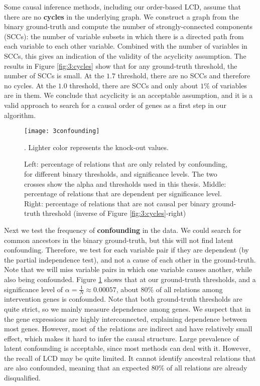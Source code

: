 Some causal inference methods, including our order-based LCD, assume that there are no \textbf{cycles} in the underlying graph. We construct a graph from the binary ground-truth and compute the number of strongly-connected components (SCCs): the number of variable subsets in which there is a directed path from each variable to each other variable. Combined with the number of variables in SCCs, this gives an indication of the validity of the acyclicity assumption. The results in Figure \ref{fig:3:cycles} show that for any ground-truth threshold, the number of SCCs is small. At the $1.7$ threshold, there are no SCCs and therefore no cycles. At the $1.0$ threshold, there are SCCs and only about $1\%$ of variables are in them. We conclude that acyclicity is an acceptable assumption, and it is a valid approach to search for a causal order of genes as a first step in our algorithm.

\begin{figure}[h]
    \centering
    \texttt{[image: 3confounding]}
    \caption{Left: percentage of relations that are only related by confounding, for different binary thresholds, and significance levels. The two crosses show the alpha and thresholds used in this thesis. Middle: percentage of relations that are dependent per significance level. Right: percentage of relations that are not causal per binary ground-truth threshold (inverse of Figure \ref{fig:3:cycles}-right)}. Lighter color represents the knock-out values.
    \label{fig:3:confounding}
\end{figure}    

Next we test the frequency of \textbf{confounding} in the data. We could search for common ancestors in the binary ground-truth, but this will not find latent confounding. Therefore, we test for each variable pair if they are dependent (by the partial independence test), and not a cause of each other in the ground-truth. Note that we will miss variable pairs in which one variable causes another, while also being confounded. Figure \ref{fig:3:confounding} shows that at our ground-truth thresholds, and a significance level of $\alpha = \frac{1}{N} \approx 0.00057$, about $80\%$ of all relations among intervention genes is confounded. Note that both ground-truth thresholds are quite strict, so we mainly measure dependence among genes. We suspect that in the gene expressions are highly interconnected, explaining dependence between most genes. However, most of the relations are indirect and have relatively small effect, which makes it hard to infer the causal structure. Large prevalence of latent confounding is acceptable, since most methods can deal with it. However, the recall of LCD may be quite limited. It cannot identify ancestral relations that are also confounded, meaning that an expected $80\%$ of all relations are already disqualified.


